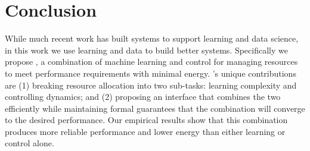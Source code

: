 \section{Conclusion}
While much recent work has built systems to support learning and data
science, in this work we use learning and data to build better
systems.  Specifically we propose \SYSTEM{}, a combination of machine
learning and control for managing resources to meet performance
requirements with minimal energy.  \SYSTEM{}'s unique contributions
are (1) breaking resource allocation into two sub-tasks: learning
complexity and controlling dynamics; and (2) proposing an interface
that combines the two efficiently while maintaining formal guarantees
that the combination will converge to the desired performance. Our
empirical results show that this combination produces more reliable
performance and lower energy than either learning or control alone.
